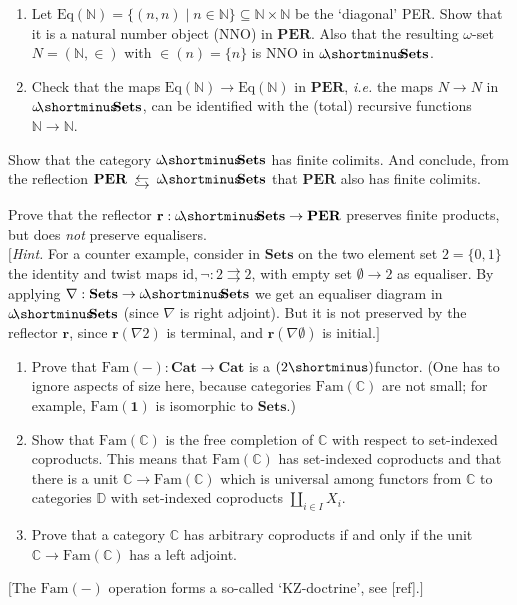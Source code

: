 \documentclass{report}
\newcommand{\bC}[0]{\mathbb C}
\newcommand{\bD}[0]{\mathbb D}
\newcommand{\bN}[0]{\mathbb N}
\newcommand{\idd}[0]{\mathrm{id}}
\newcommand{\Cat}[0]{\mathbf{Cat}}
\newcommand{\Sets}[0]{\mathbf{Sets}}
\newcommand{\PER}[0]{\mathbf{PER}}
\newcommand{\omgSets}[0]{\omega\!\!\shortminus\!\!\Sets}
\newcommand{\Fam}[0]{\mathrm{Fam}}
\newcommand{\Eq}[0]{\mathrm{Eq}}
\newcommand{\reflective}[0]{\begin{array}{c} \leftarrow \\[-0.25cm] \hookrightarrow\\[-0.1cm]\end{array}}
\begin{document}
\begin{exo}
    \begin{enumerate}[label=(\roman*)]
        \item Let $\Eq(\bN) = \{(n,n)\mid n\in \bN\}\subseteq \bN\times\bN$ be the `diagonal' PER. Show
        that it is a natural number object (NNO) in $\PER$. Also that the resulting $\omega$-set $N =
        (\bN,\in)$ with $\in (n) = \{n\}$ is NNO in $\omgSets$.
        \item Check that the maps $\Eq(\bN)\to \Eq(\bN)$ in $\PER$, \textit{i.e.} the maps $N\to N$ in
        $\omgSets$, can be identified with the (total) recursive functions $\bN\to\bN$.
    \end{enumerate}
\end{exo}

\begin{exo}
    Show that the category $\omgSets$ has finite colimits. And conclude, from the reflection
    $\PER\reflective \omgSets$ that $\PER$ also has finite colimits.
\end{exo}

\begin{exo}
    Prove that the reflector $\mathbf{r} : \omgSets\to\PER$ preserves finite products, but does \textit{not}
    preserve equalisers.\\
    $[$\textit{Hint.} For a counter example, consider in $\Sets$ on the two element set $2 = \{0,1\}$ the
    identity and twist maps $\idd,\lnot : 2 \rightrightarrows 2$, with empty set $\emptyset\to 2$ as
    equaliser. By applying $\nabla : \Sets \to \omgSets$ we get an equaliser diagram in $\omgSets$ (since
    $\nabla$ is right adjoint). But it is not preserved by the reflector $\mathbf{r}$, since $\mathbf{r}
    (\nabla 2)$ is terminal, and $\mathbf{r}(\nabla\emptyset)$ is initial.$]$
\end{exo}

\begin{exo}
    \begin{enumerate}[label=(\roman*)]
        \item Prove that $\Fam(-) : \Cat \to \Cat$ is a $(2\shortminus)$functor. (One has to ignore aspects
        of size here, because categories $\Fam(\bC)$ are not small; for example, $\Fam(\boldsymbol{1})$ is
        isomorphic to $\Sets$.)
        \item Show that $\Fam(\bC)$ is the free completion of $\bC$ with respect to set-indexed coproducts.
        This means that $\Fam(\bC)$ has set-indexed coproducts and that there is a unit $\bC\to\Fam(\bC)$
        which is universal among functors from $\bC$ to categories $\bD$ with set-indexed coproducts
        $\coprod_{i\in I} X_i$.
        \item Prove that a category $\bC$ has arbitrary coproducts if and only if the unit $\bC\to\Fam(\bC)$
        has a left adjoint.
    \end{enumerate}
    $[$The $\Fam(-)$ operation forms a so-called `KZ-doctrine', see [ref].$]$
\end{exo}
\end{document}
